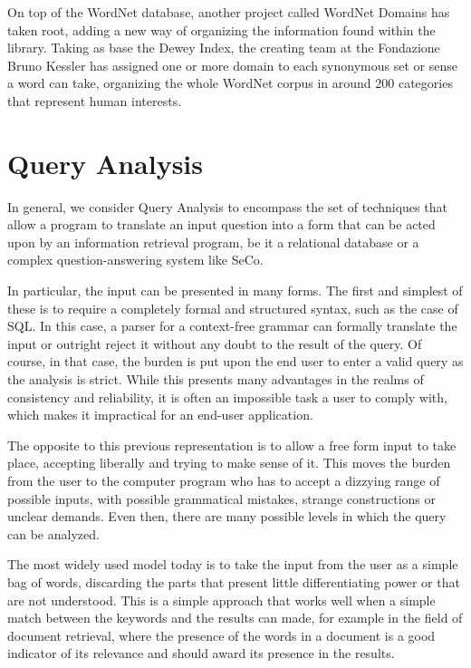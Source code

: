 On top of the WordNet database, another project called WordNet Domains has taken root, adding a new way of organizing the information found within the library. Taking as base the Dewey Index, the creating team at the Fondazione Bruno Kessler has assigned one or more domain to each synonymous set or sense a word can take, organizing the whole WordNet corpus in around 200 categories that represent human interests.




\section{Query Analysis} %
\label{sec:query_analysis}

In general, we consider Query Analysis to encompass the set of techniques that allow a program to translate an input question into a form that can be acted upon by an information retrieval program, be it a relational database or a complex question-answering system like SeCo.

In particular, the input can be presented in many forms. The first and simplest of these is to require a completely formal and structured syntax, such as the case of SQL. In this case, a parser for a context-free grammar can formally translate the input or outright reject it without any doubt to the result of the query. Of course, in that case, the burden is put upon the end user to enter a valid query as the analysis is strict. While this presents many advantages in the realms of consistency and reliability, it is often an impossible task a user to comply with, which makes it impractical for an end-user application.

The opposite to this previous representation is to allow a free form input to take place, accepting liberally and trying to make sense of it. This moves the burden from the user to the computer program who has to accept a dizzying range of possible inputs, with possible grammatical mistakes, strange constructions or unclear demands. Even then, there are many possible levels in which the query can be analyzed.

The most widely used model today is to take the input from the user as a simple bag of words, discarding the parts that present little differentiating power or that are not understood. This is a simple approach that works well when a simple match between the keywords and the results can made, for example in the field of document retrieval, where the presence of the words in a document is a good indicator of its relevance and should award its presence in the results.

